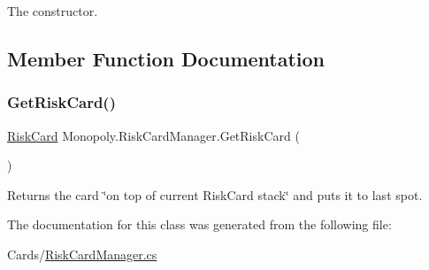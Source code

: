 The constructor. 

\subsection{Member Function Documentation}
\mbox{\label{class_monopoly_1_1_risk_card_manager_a43593d584bea56a241b9d58fd71429ae}} 
\subsubsection{\texorpdfstring{Get\+Risk\+Card()}{GetRiskCard()}}
{\footnotesize\ttfamily \mbox{\hyperlink{class_monopoly_1_1_main_1_1_risk_card}{Risk\+Card}} Monopoly.\+Risk\+Card\+Manager.\+Get\+Risk\+Card (\begin{DoxyParamCaption}{ }\end{DoxyParamCaption})\hspace{0.3cm}{\ttfamily [inline]}}

Returns the card \char`\"{}on top of current Risk\+Card stack\char`\"{} and puts it to last spot. 

The documentation for this class was generated from the following file\+:\begin{DoxyCompactItemize}
\item 
Cards/\mbox{\hyperlink{_risk_card_manager_8cs}{Risk\+Card\+Manager.\+cs}}\end{DoxyCompactItemize}
